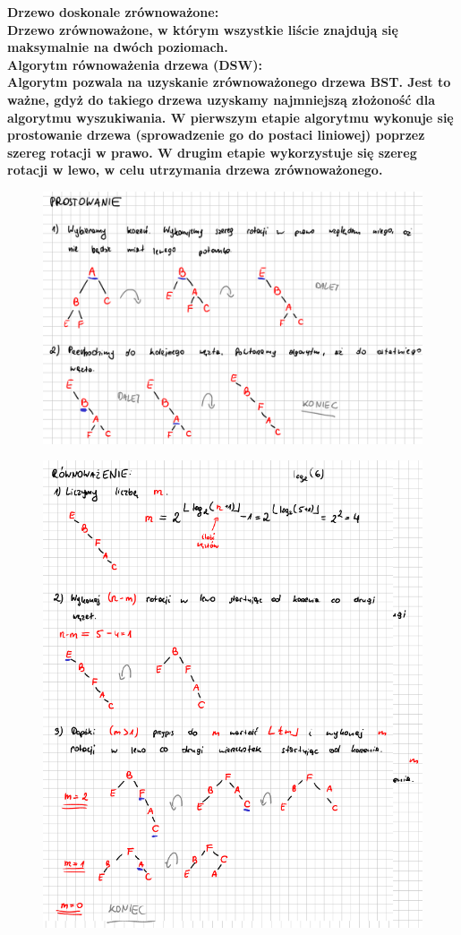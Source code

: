 \documentclass[a4paper,12pt]{article}
\newcommand{\h}[1]{\noindent \bf #1 \rm \\ \noindent}
\begin{document}
\h{Drzewo doskonale zrównoważone:}
Drzewo zrównoważone, w którym wszystkie liście znajdują się maksymalnie na dwóch poziomach.\\

\h{Algorytm równoważenia drzewa (DSW):}
Algorytm pozwala na uzyskanie zrównoważonego drzewa BST. Jest to ważne, gdyż do takiego drzewa uzyskamy najmniejszą złożoność dla algorytmu wyszukiwania. W pierwszym etapie algorytmu wykonuje się prostowanie drzewa (sprowadzenie go do postaci liniowej) poprzez szereg rotacji w prawo. W drugim etapie wykorzystuje się szereg rotacji w lewo, w celu utrzymania drzewa zrównoważonego.
\begin{figure}[H]
	\centering
	\includegraphics[width=14cm]{fig8.png}
\end{figure}
\begin{figure}[H]
	\centering
	\includegraphics[width=14cm]{fig9.png}
\end{figure}

	
\end{document}
